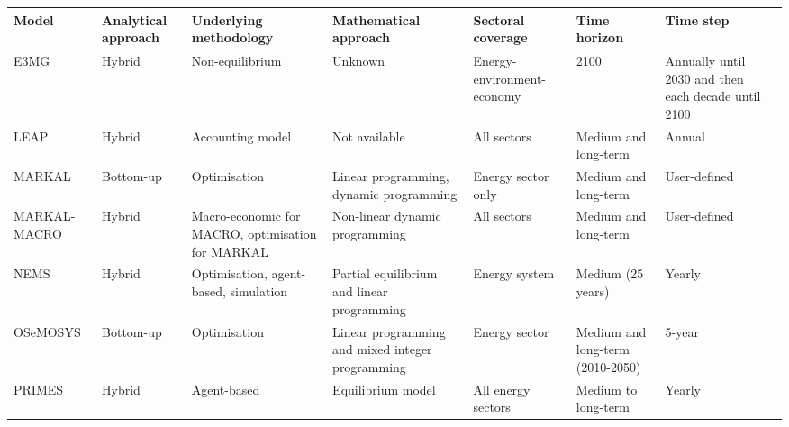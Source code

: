 \begin{table}[]
	\footnotesize
	\begin{tabular}{@{}p{2cm}p{2cm}p{2cm}p{2cm}p{2cm}p{2cm}p{2cm}p{2cm}}
		\toprule
		\textbf{Model} & \textbf{Analytical approach} & \textbf{Underlying methodology}                   & \textbf{Mathematical approach}                   & \textbf{Sectoral coverage} & \textbf{Time horizon}            & \textbf{Time step}                                  \\ \midrule
		E3MG           & Hybrid                       & Non-equilibrium                                   & Unknown                                          & Energy-environment-economy & 2100                             & Annually until 2030 and then each decade until 2100 \\
		LEAP           & Hybrid                       & Accounting model                                  & Not available                                    & All sectors                & Medium and long-term             & Annual                                              \\
		MARKAL         & Bottom-up                    & Optimisation                                      & Linear programming, dynamic programming          & Energy sector only         & Medium and long-term             & User-defined                                        \\
		MARKAL-MACRO   & Hybrid                       & Macro-economic for MACRO, optimisation for MARKAL & Non-linear dynamic programming                   & All sectors                & Medium and long-term             & User-defined                                        \\
		NEMS           & Hybrid                       & Optimisation, agent-based, simulation             & Partial equilibrium and linear programming       & Energy system              & Medium (25 years)                & Yearly                                              \\
		OSeMOSYS       & Bottom-up                    & Optimisation                                      & Linear programming and mixed integer programming & Energy sector              & Medium and long-term (2010-2050) & 5-year                                              \\
		PRIMES         & Hybrid                       & Agent-based                                       & Equilibrium model                                & All energy sectors         & Medium to long-term              & Yearly                                              \\

\end{tabular}
\end{table}
